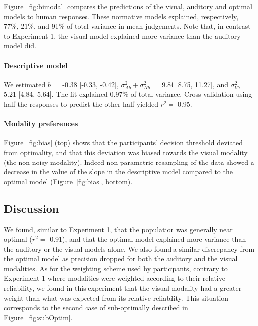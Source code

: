 \documentclass[english,floatsintext,man]{apa6}
\theoremstyle{definition}
\theoremstyle{definition}
\theoremstyle{definition}
\theoremstyle{remark}
\begin{document}
Figure~\ref{fig:bimodal} compares the predictions of the visual,
auditory and optimal models to human responses. These normative models
explained, respectively, 77\%, 21\%, and 91\% of total variance in mean
judgements. Note that, in contrast to Experiment 1, the visual model
explained more variance than the auditory model did.

\paragraph{Descriptive model}\label{descriptive-model-1}

We estimated \(b=\) -0.38 {[}-0.33, -0.42{]},
\(\sigma^2_{Ab}+\sigma^2_{Nb}=\) 9.84 {[}8.75, 11.27{]}, and
\(\sigma^2_{Vb}=\) 5.21 {[}4.84, 5.64{]}. The fit explained 0.97\% of
total variance. Cross-validation using half the responses to predict the
other half yielded \(r^2 =\) 0.95.

\paragraph{Modality preferences}\label{modality-preferences}

Figure~\ref{fig:bias} (top) shows that the participants' decision
threshold deviated from optimality, and that this deviation was biased
towards the visual modality (the non-noisy modality). Indeed
non-parametric resampling of the data showed a decrease in the value of
the slope in the descriptive model compared to the optimal model
(Figure~\ref{fig:bias}, bottom).

\subsection{Discussion}\label{discussion-1}

We found, similar to Experiment 1, that the population was generally
near optimal (\(r^2 =\) 0.91), and that the optimal model explained more
variance than the auditory or the visual models alone. We also found a
similar discrepancy from the optimal model as precision dropped for both
the auditory and the visual modalities. As for the weighting scheme used
by participants, contrary to Experiment 1 where modalities were weighted
according to their relative reliability, we found in this experiment
that the visual modality had a greater weight than what was expected
from its relative reliability. This situation corresponds to the second
case of sub-optimally described in Figure~\ref{fig:subOptim}.
\end{document}

